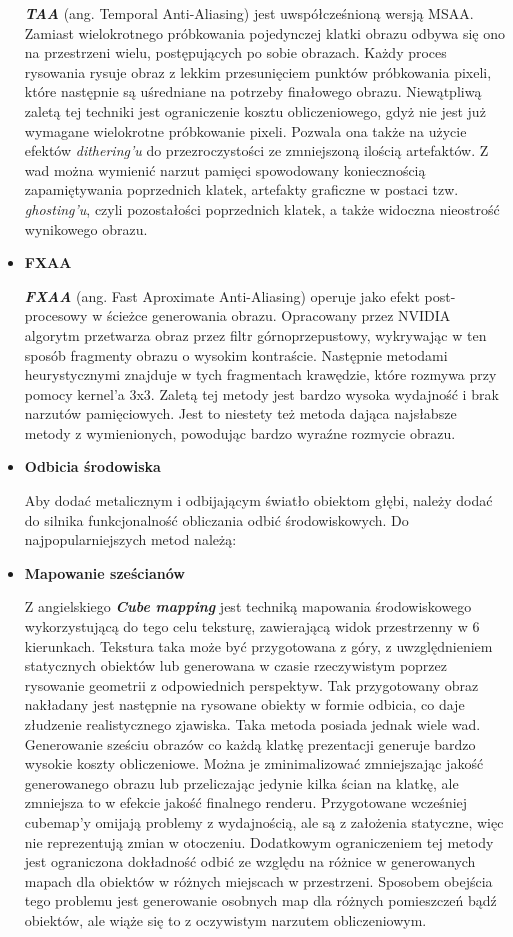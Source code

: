 \begin{itemize}
	\emph{\textbf{TAA}} (ang. Temporal Anti-Aliasing) jest uwspółcześnioną wersją MSAA. Zamiast wielokrotnego próbkowania pojedynczej klatki obrazu odbywa się ono na przestrzeni wielu, postępujących po sobie obrazach. Każdy proces rysowania rysuje obraz z lekkim przesunięciem punktów próbkowania pixeli, które następnie są uśredniane na potrzeby finałowego obrazu. Niewątpliwą zaletą tej techniki jest ograniczenie kosztu obliczeniowego, gdyż nie jest już wymagane wielokrotne próbkowanie pixeli. Pozwala ona także na użycie efektów \emph{dithering'u} do przezroczystości ze zmniejszoną ilością artefaktów. Z wad można wymienić narzut pamięci spowodowany koniecznością zapamiętywania poprzednich klatek, artefakty graficzne w postaci tzw. \emph{ghosting'u}, czyli pozostałości poprzednich klatek, a także widoczna nieostrość wynikowego obrazu.
	
	\item \textbf{FXAA}
	
	\emph{\textbf{FXAA}} (ang. Fast Aproximate Anti-Aliasing) operuje jako efekt post-procesowy w ścieżce generowania obrazu. Opracowany przez NVIDIA algorytm przetwarza obraz przez filtr górnoprzepustowy, wykrywając w ten sposób fragmenty obrazu o wysokim kontraście. Następnie metodami heurystycznymi znajduje w tych fragmentach krawędzie, które rozmywa przy pomocy kernel'a 3x3. Zaletą tej metody jest bardzo wysoka wydajność i brak narzutów pamięciowych. Jest to niestety też metoda dająca najsłabsze metody z wymienionych, powodując bardzo wyraźne rozmycie obrazu.
	
	\item \textbf{Odbicia środowiska}
	
	Aby dodać metalicznym i odbijającym światło obiektom głębi, należy dodać do silnika funkcjonalność obliczania odbić środowiskowych. Do najpopularniejszych metod należą:

	\item \textbf{Mapowanie sześcianów}

	Z angielskiego \emph{\textbf{Cube mapping}} jest techniką mapowania środowiskowego wykorzystującą do tego celu teksturę, zawierającą widok przestrzenny w 6 kierunkach. Tekstura taka może być przygotowana z góry, z uwzględnieniem statycznych obiektów lub generowana w czasie rzeczywistym poprzez rysowanie geometrii z odpowiednich perspektyw. Tak przygotowany obraz nakładany jest następnie na rysowane obiekty w formie odbicia, co daje złudzenie realistycznego zjawiska.
	Taka metoda posiada jednak wiele wad. Generowanie sześciu obrazów co każdą klatkę prezentacji generuje bardzo wysokie koszty obliczeniowe. Można je zminimalizować zmniejszając jakość generowanego obrazu lub przeliczając jedynie kilka ścian na klatkę, ale zmniejsza to w efekcie jakość finalnego renderu. Przygotowane wcześniej cubemap'y omijają problemy z wydajnością, ale są z założenia statyczne, więc nie reprezentują zmian w otoczeniu. Dodatkowym ograniczeniem tej metody jest ograniczona dokładność odbić ze względu na różnice w generowanych mapach dla obiektów w różnych miejscach w przestrzeni. Sposobem obejścia tego problemu jest generowanie osobnych map dla różnych pomieszczeń bądź obiektów, ale wiąże się to z oczywistym narzutem obliczeniowym.
	

\end{itemize}
